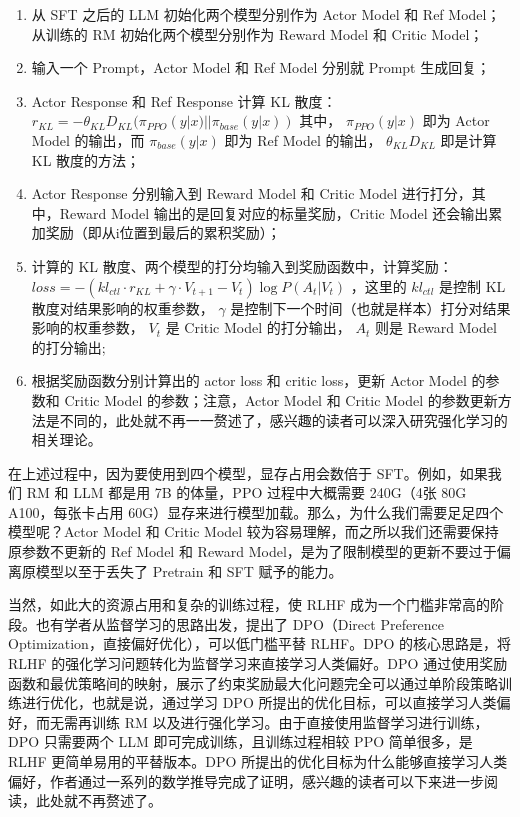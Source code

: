 \documentclass[
]{article}
\providecommand{\tightlist}{%
  \setlength{\itemsep}{0pt}\setlength{\parskip}{0pt}}
\begin{document}
\begin{enumerate}
\def\labelenumi{\arabic{enumi}.}
\tightlist
\item
  从 SFT 之后的 LLM 初始化两个模型分别作为 Actor Model 和 Ref
  Model；从训练的 RM 初始化两个模型分别作为 Reward Model 和 Critic
  Model；
\item
  输入一个 Prompt，Actor Model 和 Ref Model 分别就 Prompt 生成回复；
\item
  Actor Response 和 Ref Response 计算 KL 散度：
  \(r_{KL} = -\theta_{KL}D_{KL}(\pi_{PPO}(y|x)||\pi_{base}(y|x))\)
  其中， \(\pi_{PPO}(y|x)\) 即为 Actor Model 的输出，而
  \(\pi_{base}(y|x)\) 即为 Ref Model 的输出， \(\theta_{KL}D_{KL}\)
  即是计算 KL 散度的方法；
\item
  Actor Response 分别输入到 Reward Model 和 Critic Model
  进行打分，其中，Reward Model 输出的是回复对应的标量奖励，Critic Model
  还会输出累加奖励（即从i位置到最后的累积奖励）；
\item
  计算的 KL 散度、两个模型的打分均输入到奖励函数中，计算奖励：
  \(loss = -(kl_{ctl} \cdot r_{KL} + \gamma \cdot V_{t+1} - V_{t}) \log P(A_t|V_t)\)
  ，这里的 \(kl_{ctl}\) 是控制 KL 散度对结果影响的权重参数， \(\gamma\)
  是控制下一个时间（也就是样本）打分对结果影响的权重参数， \(V_t\) 是
  Critic Model 的打分输出， \(A_t\) 则是 Reward Model 的打分输出;
\item
  根据奖励函数分别计算出的 actor loss 和 critic loss，更新 Actor Model
  的参数和 Critic Model 的参数；注意，Actor Model 和 Critic Model
  的参数更新方法是不同的，此处就不再一一赘述了，感兴趣的读者可以深入研究强化学习的相关理论。
\end{enumerate}

在上述过程中，因为要使用到四个模型，显存占用会数倍于 SFT。例如，如果我们
RM 和 LLM 都是用 7B 的体量，PPO 过程中大概需要 240G（4张 80G
A100，每张卡占用
60G）显存来进行模型加载。那么，为什么我们需要足足四个模型呢？Actor Model
和 Critic Model 较为容易理解，而之所以我们还需要保持原参数不更新的 Ref
Model 和 Reward
Model，是为了限制模型的更新不要过于偏离原模型以至于丢失了 Pretrain 和
SFT 赋予的能力。

当然，如此大的资源占用和复杂的训练过程，使 RLHF
成为一个门槛非常高的阶段。也有学者从监督学习的思路出发，提出了
DPO（Direct Preference Optimization，直接偏好优化），可以低门槛平替
RLHF。DPO 的核心思路是，将 RLHF
的强化学习问题转化为监督学习来直接学习人类偏好。DPO
通过使用奖励函数和最优策略间的映射，展示了约束奖励最大化问题完全可以通过单阶段策略训练进行优化，也就是说，通过学习
DPO 所提出的优化目标，可以直接学习人类偏好，而无需再训练 RM
以及进行强化学习。由于直接使用监督学习进行训练，DPO 只需要两个 LLM
即可完成训练，且训练过程相较 PPO 简单很多，是 RLHF
更简单易用的平替版本。DPO
所提出的优化目标为什么能够直接学习人类偏好，作者通过一系列的数学推导完成了证明，感兴趣的读者可以下来进一步阅读，此处就不再赘述了。
\end{document}
